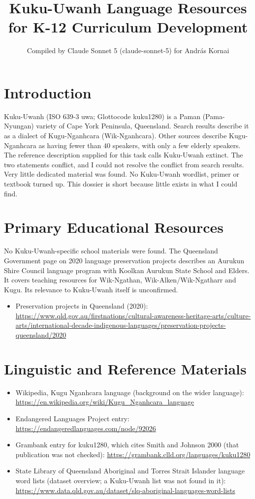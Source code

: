 \documentclass[12pt]{article}
\title{Kuku-Uwanh Language Resources for K-12 Curriculum Development}
\author{Compiled by Claude Sonnet 5 (claude-sonnet-5) for Andr\'as Kornai}
\date{}
\begin{document}
\maketitle

\section{Introduction}
Kuku-Uwanh (ISO 639-3 uwa; Glottocode kuku1280) is a Paman (Pama-Nyungan) variety of Cape York Peninsula, Queensland. Search results describe it as a dialect of Kugu-Nganhcara (Wik-Nganhcara). Other sources describe Kugu-Nganhcara as having fewer than 40 speakers, with only a few elderly speakers. The reference description supplied for this task calls Kuku-Uwanh extinct. The two statements conflict, and I could not resolve the conflict from search results. Very little dedicated material was found. No Kuku-Uwanh wordlist, primer or textbook turned up. This dossier is short because little exists in what I could find.

\section{Primary Educational Resources}
No Kuku-Uwanh-specific school materials were found. The Queensland Government page on 2020 language preservation projects describes an Aurukun Shire Council language program with Koolkan Aurukun State School and Elders. It covers teaching resources for Wik-Ngathan, Wik-Alken/Wik-Ngatharr and Kugu. Its relevance to Kuku-Uwanh itself is unconfirmed.
\begin{itemize}
\item Preservation projects in Queensland (2020): \url{https://www.qld.gov.au/firstnations/cultural-awareness-heritage-arts/culture-arts/international-decade-indigenous-languages/preservation-projects-queensland/2020}
\end{itemize}

\section{Linguistic and Reference Materials}
\begin{itemize}
\item Wikipedia, Kugu Nganhcara language (background on the wider language): \url{https://en.wikipedia.org/wiki/Kugu_Nganhcara_language}
\item Endangered Languages Project entry: \url{https://endangeredlanguages.com/node/92026}
\item Grambank entry for kuku1280, which cites Smith and Johnson 2000 (that publication was not checked): \url{https://grambank.clld.org/languages/kuku1280}
\item State Library of Queensland Aboriginal and Torres Strait Islander language word lists (dataset overview; a Kuku-Uwanh list was not found in it): \url{https://www.data.qld.gov.au/dataset/slq-aboriginal-languages-word-lists}
\end{itemize}
\end{document}
